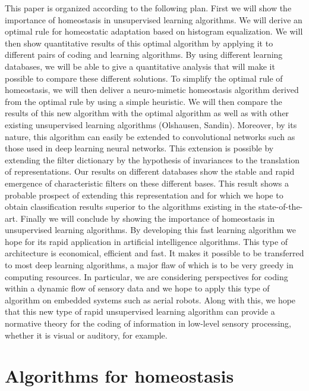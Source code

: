 \documentclass[a4paper, 11pt]{article} %
\begin{document}
This paper is organized according to the following plan. First we will
show the importance of homeostasis in unsupervised learning algorithms.
We will derive an optimal rule for homeostatic adaptation based on
histogram equalization. We will then show quantitative results of this
optimal algorithm by applying it to different pairs of coding and
learning algorithms. By using different learning databases, we will be
able to give a quantitative analysis that will make it possible to
compare these different solutions. To simplify the optimal rule of
homeostasis, we will then deliver a neuro-mimetic homeostasis algorithm
derived from the optimal rule by using a simple heuristic. We will then
compare the results of this new algorithm with the optimal algorithm as
well as with other existing unsupervised learning algorithms (Olshausen,
Sandin). Moreover, by its nature, this algorithm can easily be extended
to convolutional networks such as those used in deep learning neural
networks. This extension is possible by extending the filter dictionary
by the hypothesis of invariances to the translation of representations.
Our results on different databases show the stable and rapid emergence
of characteristic filters on these different bases. This result shows a
probable prospect of extending this representation and for which we hope
to obtain classification results superior to the algorithms existing in
the state-of-the-art. Finally we will conclude by showing the importance
of homeostasis in unsupervised learning algorithms. By developing this
fast learning algorithm we hope for its rapid application in artificial
intelligence algorithms. This type of architecture is economical,
efficient and fast. It makes it possible to be transferred to most deep
learning algorithms, a major flaw of which is to be very greedy in
computing resources. In particular, we are considering perspectives for
coding within a dynamic flow of sensory data and we hope to apply this
type of algorithm on embedded systems such as aerial robots. Along with
this, we hope that this new type of rapid unsupervised learning
algorithm can provide a normative theory for the coding of information
in low-level sensory processing, whether it is visual or auditory, for
example.

\section{Algorithms for homeostasis}\label{algorithm}
\end{document}
